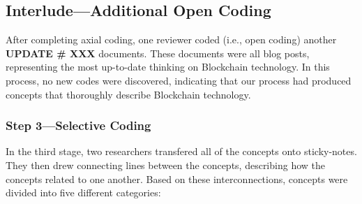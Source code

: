 \subsection{Interlude---Additional Open Coding}
After completing axial coding, one reviewer coded (i.e., open coding) another \textbf{UPDATE \# XXX} documents.
These documents were all blog posts, representing the most up-to-date thinking on Blockchain technology.
In this process, no new codes were discovered, indicating that our process had produced concepts that thoroughly describe Blockchain technology.

\subsubsection{Step 3---Selective Coding}
In the third stage, two researchers transfered all of the concepts onto sticky-notes.
They then drew connecting lines between the concepts, describing how the concepts related to one another.
Based on these interconnections, concepts were divided into five different categories:

